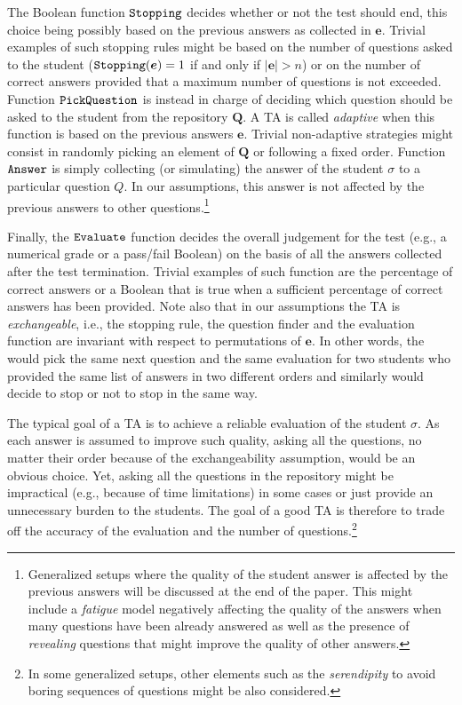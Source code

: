 \documentclass[runningheads]{llncs}
\begin{document}
The Boolean function ${\tt Stopping}$ decides whether or not the test should end, this choice being possibly based on the previous answers as collected in $\bm{e}$. Trivial examples of such stopping rules might be based on the number of questions asked to the student (${\tt Stopping}(\bm{e})=1$ if and only if $|\bm{e}|>n$) or on the number of correct answers provided that a maximum number of questions is not exceeded. Function ${\tt PickQuestion}$ is instead in charge of deciding which question should be asked to the student from the repository $\bm{Q}$. A TA is called \emph{adaptive} when this function is based on the previous answers $\bm{e}$. Trivial non-adaptive strategies might consist in randomly picking an element of $\bm{Q}$ or following a fixed order. Function ${\tt Answer}$ is simply collecting (or simulating) the answer of the student $\sigma$ to a particular question $Q$. In our assumptions, this answer is not affected by the previous answers to other questions.\footnote{Generalized setups where the quality of the student answer is affected by the previous answers will be discussed at the end of the paper. This might include a \emph{fatigue} model negatively affecting the quality of the answers when many questions have been already answered as well as the presence of \emph{revealing} questions that might improve the quality of other answers.} 

Finally, the ${\tt Evaluate}$ function decides the overall judgement for the test (e.g., a numerical grade or a pass/fail Boolean) on the basis of all the answers collected after the test termination. Trivial examples of such function are the percentage of correct answers or a Boolean that is true when a sufficient percentage of correct answers has been provided. Note also that in our assumptions the TA is \emph{exchangeable}, i.e., the stopping rule, the question finder and the evaluation function are invariant with respect to permutations of $\bm{e}$. In other words, the would pick the same next question and the same evaluation for two students who provided the same list of answers in two different orders and similarly would decide to stop or not to stop in the same way. 

The typical goal of a TA is to achieve a reliable evaluation of the student $\sigma$. As each answer is assumed to improve such quality, asking all the questions, no matter their order because of the exchangeability assumption, would be an obvious choice. Yet, asking all the questions in the repository might be impractical (e.g., because of time limitations) in some cases or just provide an unnecessary burden to the students. The goal of a good TA is therefore to trade off the accuracy of the evaluation and the number of questions.\footnote{In some generalized setups, other elements such as the \emph{serendipity} to avoid boring sequences of questions might be also considered.}
\end{document}
